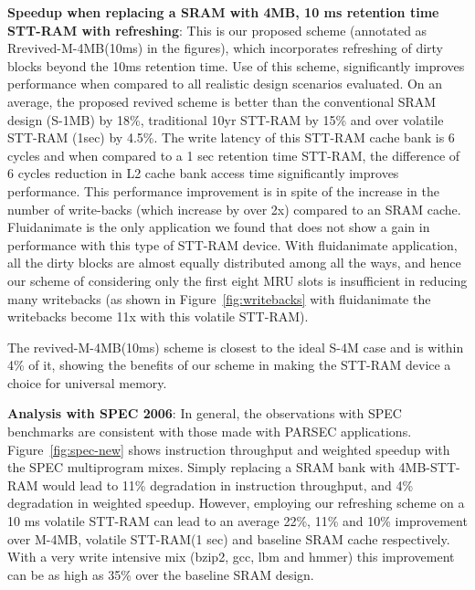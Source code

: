 {\bf Speedup when replacing a SRAM with 4MB, 10 ms retention time STT-RAM with refreshing}: This is our proposed scheme (annotated as Rrevived-M-4MB(10ms) in the figures), which incorporates refreshing of dirty blocks beyond the 10ms retention time.
Use of this scheme, significantly improves performance when compared to all realistic design scenarios evaluated. On an average, the proposed revived scheme is better than the conventional SRAM design (S-1MB) by 18\%, traditional 10yr STT-RAM by 15\% and over volatile STT-RAM (1sec)
by 4.5\%. The write latency of this STT-RAM cache bank is 6 cycles and when compared to a 1 sec retention time STT-RAM, the difference of 6 cycles reduction in L2 cache bank access time significantly improves performance. This performance improvement is in spite of the increase in the number of write-backs (which increase by over 2x) compared to an SRAM cache. Fluidanimate is the only application we found that does not show a gain in performance with this type of STT-RAM device. With fluidanimate application, all the dirty blocks are almost equally distributed among all the ways, and hence our scheme of considering only the first eight MRU slots is insufficient in reducing many writebacks (as shown in Figure~\ref{fig:writebacks} with fluidanimate the writebacks become 11x with this volatile STT-RAM). 

The revived-M-4MB(10ms) scheme is closest to the ideal S-4M case and is within 4\% of it, showing the benefits of our scheme in making the STT-RAM device a choice for universal memory.

\begin{figure*} [t]
\centering
 \caption{\label{fig:spec-new} \scriptsize \bf Normalized Average Instruction Throughput(IT) and Weighted Speedup(WS) for SPEC 2006 multiprogrammed mixes. }
\end{figure*}

{\bf Analysis with SPEC 2006}: In general, the observations with SPEC benchmarks are consistent with those made with PARSEC applications. Figure~\ref{fig:spec-new} shows instruction throughput and weighted speedup with the  SPEC multiprogram
mixes. Simply replacing a SRAM bank with 4MB-STT-RAM would lead to 11\% degradation in instruction throughput, and 4\% degradation in weighted speedup. However, employing our refreshing scheme on a 10 ms volatile STT-RAM can lead to an average 22\%, 11\%  and 10\% improvement over M-4MB, volatile STT-RAM(1 sec) and baseline SRAM cache respectively. With a very write intensive mix (bzip2, gcc, lbm and hmmer) this improvement can be as high as 35\% over the baseline SRAM design. 

